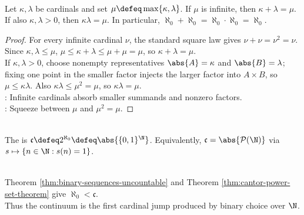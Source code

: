 \begin{theorem} \label{thm:infinite-cardinal-absorption-reference} \\
Let $\kappa,\lambda$ be cardinals and set $\mu\defeq\max\{\kappa,\lambda\}$. If $\mu$ is infinite, then $\kappa+\lambda=\mu$.\\
If also $\kappa,\lambda>0$, then $\kappa\lambda=\mu$. In particular, $\aleph_0+\aleph_0=\aleph_0\cdot\aleph_0=\aleph_0$.
\begin{proof}
For every infinite cardinal $\nu$, the standard square law gives $\nu+\nu=\nu^2=\nu$.\\
Since $\kappa,\lambda\leq\mu$, $\mu\leq \kappa+\lambda\leq\mu+\mu=\mu$, so $\kappa+\lambda=\mu$.\\
If $\kappa,\lambda>0$, choose nonempty representatives $\abs{A}=\kappa$ and $\abs{B}=\lambda$; fixing one point in the smaller factor injects the larger factor into $A\times B$, so $\mu\leq\kappa\lambda$. Also $\kappa\lambda\leq\mu^2=\mu$, so $\kappa\lambda=\mu$.\\
: Infinite cardinals absorb smaller summands and nonzero factors.\\
: Squeeze between $\mu$ and $\mu^2=\mu$.
\end{proof}
\end{theorem}

\begin{definition} \label{def:continuum-cardinal} \\
The  is $\mathfrak{c}\defeq 2^{\aleph_0}\defeq\abs{\{0,1\}^{\N}}$. Equivalently, $\mathfrak{c}=\abs{\mathcal{P}(\N)}$ via $s\mapsto\{n\in\N:s(n)=1\}$.
\end{definition}

\begin{perspective} \label{per:continuum-and-powerset-cardinality} \\
Theorem \ref{thm:binary-sequences-uncountable} and Theorem \ref{thm:cantor-power-set-theorem} give $\aleph_0<\mathfrak{c}$.\\
Thus the continuum is the first cardinal jump produced by binary choice over $\N$.
\end{perspective}

